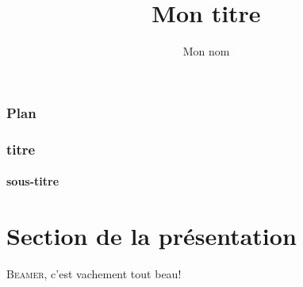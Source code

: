 \documentclass{beamer}  %
\title{Mon titre}
\author{Mon nom}
\institute{URC PO}
\begin{document}
\begin{frame} %
\titlepage
\end{frame}
\begin{frame} %
\frametitle{Plan}
\tableofcontents
\end{frame}
\begin{frame} %
\frametitle{titre} \framesubtitle{sous-titre}
\section{Section de la présentation}
\textsc{Beamer}, c’est vachement tout beau!
\end{frame}
\end{document}

